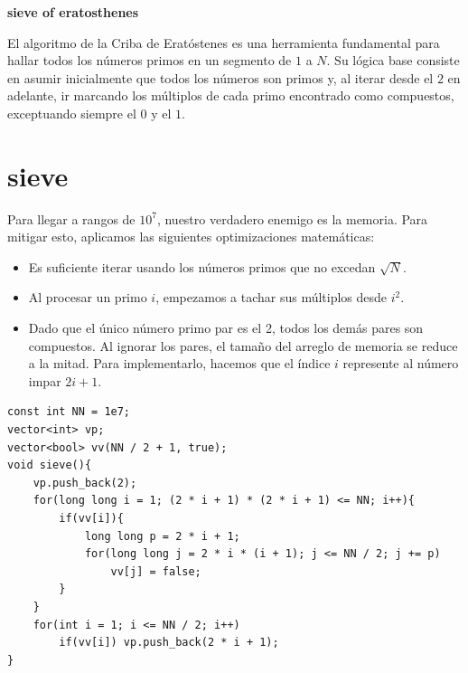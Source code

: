\documentclass[12pt]{article}
\begin{document}
\begin{center}
    \huge \textbf{sieve of eratosthenes}
    \vspace{0.5cm}
\end{center}
El algoritmo de la Criba de Eratóstenes es una herramienta fundamental para hallar todos los números primos en un segmento de $1$ a $N$. Su lógica base consiste en asumir inicialmente que todos los números son primos y, al iterar desde el $2$ en adelante, ir marcando los múltiplos de cada primo encontrado como compuestos, exceptuando siempre el $0$ y el $1$.
\section{sieve}
Para llegar a rangos de $10^7$, nuestro verdadero enemigo es la memoria. Para mitigar esto, aplicamos las siguientes optimizaciones matemáticas:
\begin{itemize}
    \item Es suficiente iterar usando los números primos que no excedan $\sqrt{N}$.
    \item Al procesar un primo $i$, empezamos a tachar sus múltiplos desde $i^2$.
    \item Dado que el único número primo par es el 2, todos los demás pares son compuestos. Al ignorar los pares, el tamaño del arreglo de memoria se reduce a la mitad. Para implementarlo, hacemos que el índice $i$ represente al número impar $2i + 1$.
\end{itemize}
\begin{lstlisting}
const int NN = 1e7;
vector<int> vp;
vector<bool> vv(NN / 2 + 1, true); 
void sieve(){
    vp.push_back(2);
    for(long long i = 1; (2 * i + 1) * (2 * i + 1) <= NN; i++){
        if(vv[i]){
            long long p = 2 * i + 1;
            for(long long j = 2 * i * (i + 1); j <= NN / 2; j += p)
                vv[j] = false;
        }
    }
    for(int i = 1; i <= NN / 2; i++)
        if(vv[i]) vp.push_back(2 * i + 1);
}
\end{lstlisting}
\end{document}
